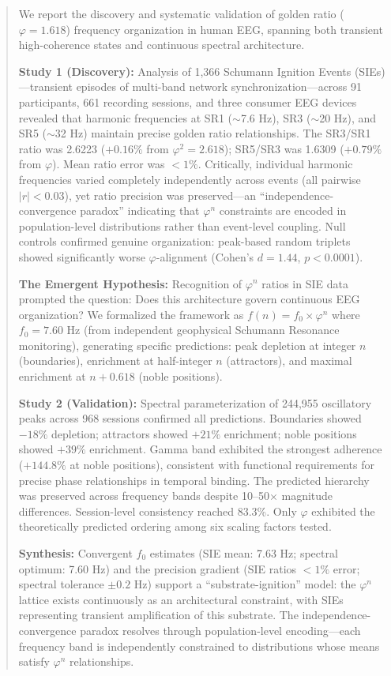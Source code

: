 \documentclass[11pt,a4paper]{article}
\newcommand{\phisym}{\varphi}
\begin{document}
\begin{abstract}
We report the discovery and systematic validation of golden ratio ($\phisym = 1.618$) frequency organization in human EEG, spanning both transient high-coherence states and continuous spectral architecture.

\textbf{Study 1 (Discovery):} Analysis of 1,366 Schumann Ignition Events (SIEs)---transient episodes of multi-band network synchronization---across 91 participants, 661 recording sessions, and three consumer EEG devices revealed that harmonic frequencies at SR1 ($\sim$7.6 Hz), SR3 ($\sim$20 Hz), and SR5 ($\sim$32 Hz) maintain precise golden ratio relationships. The SR3/SR1 ratio was 2.6223 ($+0.16\%$ from $\phisym^2 = 2.618$); SR5/SR3 was 1.6309 ($+0.79\%$ from $\phisym$). Mean ratio error was $<1\%$. Critically, individual harmonic frequencies varied completely independently across events (all pairwise $|r| < 0.03$), yet ratio precision was preserved---an ``independence-convergence paradox'' indicating that $\phisym^n$ constraints are encoded in population-level distributions rather than event-level coupling. Null controls confirmed genuine organization: peak-based random triplets showed significantly worse $\phisym$-alignment (Cohen's $d = 1.44$, $p < 0.0001$).

\textbf{The Emergent Hypothesis:} Recognition of $\phisym^n$ ratios in SIE data prompted the question: Does this architecture govern continuous EEG organization? We formalized the framework as $f(n) = f_0 \times \phisym^n$ where $f_0 = 7.60$ Hz (from independent geophysical Schumann Resonance monitoring), generating specific predictions: peak depletion at integer $n$ (boundaries), enrichment at half-integer $n$ (attractors), and maximal enrichment at $n + 0.618$ (noble positions).

\textbf{Study 2 (Validation):} Spectral parameterization of 244,955 oscillatory peaks across 968 sessions confirmed all predictions. Boundaries showed $-18\%$ depletion; attractors showed $+21\%$ enrichment; noble positions showed $+39\%$ enrichment. Gamma band exhibited the strongest adherence ($+144.8\%$ at noble positions), consistent with functional requirements for precise phase relationships in temporal binding. The predicted hierarchy was preserved across frequency bands despite 10--50$\times$ magnitude differences. Session-level consistency reached 83.3\%. Only $\phisym$ exhibited the theoretically predicted ordering among six scaling factors tested.

\textbf{Synthesis:} Convergent $f_0$ estimates (SIE mean: 7.63 Hz; spectral optimum: 7.60 Hz) and the precision gradient (SIE ratios $<1\%$ error; spectral tolerance $\pm 0.2$ Hz) support a ``substrate-ignition'' model: the $\phisym^n$ lattice exists continuously as an architectural constraint, with SIEs representing transient amplification of this substrate. The independence-convergence paradox resolves through population-level encoding---each frequency band is independently constrained to distributions whose means satisfy $\phisym^n$ relationships.


\end{abstract}
\end{document}

